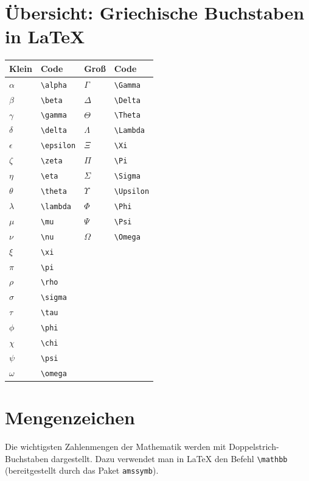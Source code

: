 \documentclass[a4paper,12pt]{article}
\begin{document}
\section{Übersicht: Griechische Buchstaben in \LaTeX}

\begin{center}
\begin{tabular}{ll|ll}
\textbf{Klein} & \textbf{Code} & \textbf{Groß} & \textbf{Code} \\
\hline
$\alpha$ & \verb|\alpha| & $\Gamma$ & \verb|\Gamma| \\
$\beta$ & \verb|\beta| & $\Delta$ & \verb|\Delta| \\
$\gamma$ & \verb|\gamma| & $\Theta$ & \verb|\Theta| \\
$\delta$ & \verb|\delta| & $\Lambda$ & \verb|\Lambda| \\
$\epsilon$ & \verb|\epsilon| & $\Xi$ & \verb|\Xi| \\
$\zeta$ & \verb|\zeta| & $\Pi$ & \verb|\Pi| \\
$\eta$ & \verb|\eta| & $\Sigma$ & \verb|\Sigma| \\
$\theta$ & \verb|\theta| & $\Upsilon$ & \verb|\Upsilon| \\
$\lambda$ & \verb|\lambda| & $\Phi$ & \verb|\Phi| \\
$\mu$ & \verb|\mu| & $\Psi$ & \verb|\Psi| \\
$\nu$ & \verb|\nu| & $\Omega$ & \verb|\Omega| \\
$\xi$ & \verb|\xi| & & \\
$\pi$ & \verb|\pi| & & \\
$\rho$ & \verb|\rho| & & \\
$\sigma$ & \verb|\sigma| & & \\
$\tau$ & \verb|\tau| & & \\
$\phi$ & \verb|\phi| & & \\
$\chi$ & \verb|\chi| & & \\
$\psi$ & \verb|\psi| & & \\
$\omega$ & \verb|\omega| & & \\
\end{tabular}
\end{center}

\section{Mengenzeichen}

Die wichtigsten Zahlenmengen der Mathematik werden mit Doppelstrich-Buchstaben dargestellt.  
Dazu verwendet man in \LaTeX{} den Befehl \verb|\mathbb|{} (bereitgestellt durch das Paket \texttt{amssymb}).
\end{document}
